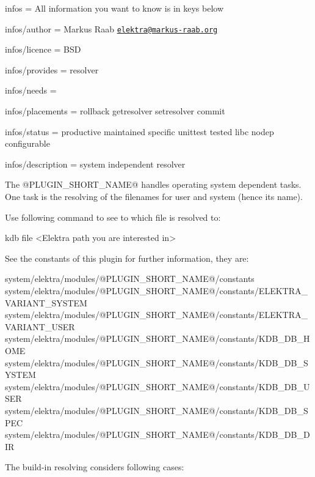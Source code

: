 
\begin{DoxyItemize}
\item infos = All information you want to know is in keys below
\item infos/author = Markus Raab \href{mailto:elektra@markus-raab.org}{\tt elektra@markus-\/raab.\+org}
\item infos/licence = B\+SD
\item infos/provides = resolver
\item infos/needs =
\item infos/placements = rollback getresolver setresolver commit
\item infos/status = productive maintained specific unittest tested libc nodep configurable
\item infos/description = system independent resolver
\end{DoxyItemize}

The {\ttfamily @P\+L\+U\+G\+I\+N\+\_\+\+S\+H\+O\+R\+T\+\_\+\+N\+A\+ME@} handles operating system dependent tasks. One task is the resolving of the filenames for user and system (hence its name).

Use following command to see to which file is resolved to\+: \begin{DoxyVerb}kdb file <Elektra path you are interested in>
\end{DoxyVerb}


See the constants of this plugin for further information, they are\+: \begin{DoxyVerb}system/elektra/modules/@PLUGIN_SHORT_NAME@/constants
system/elektra/modules/@PLUGIN_SHORT_NAME@/constants/ELEKTRA_VARIANT_SYSTEM
system/elektra/modules/@PLUGIN_SHORT_NAME@/constants/ELEKTRA_VARIANT_USER
system/elektra/modules/@PLUGIN_SHORT_NAME@/constants/KDB_DB_HOME
system/elektra/modules/@PLUGIN_SHORT_NAME@/constants/KDB_DB_SYSTEM
system/elektra/modules/@PLUGIN_SHORT_NAME@/constants/KDB_DB_USER
system/elektra/modules/@PLUGIN_SHORT_NAME@/constants/KDB_DB_SPEC
system/elektra/modules/@PLUGIN_SHORT_NAME@/constants/KDB_DB_DIR
\end{DoxyVerb}


The build-\/in resolving considers following cases\+:


